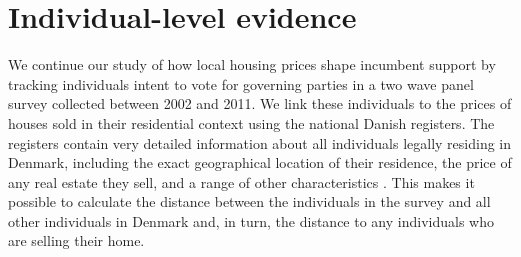 \documentclass[12pt,a4paper]{article}
\begin{document}








\section{Individual-level evidence}
We continue our study of how local housing prices shape incumbent support by tracking individuals intent to vote for governing parties in a two wave panel survey collected between 2002 and 2011. We link these individuals to the prices of houses sold in their residential context using the national Danish registers. The registers contain very detailed information about all individuals legally residing in Denmark, including the exact geographical location of their residence, the price of any real estate they sell, and a range of other characteristics \citep{thygesen2011introduction}. This makes it possible to calculate the distance between the individuals in the survey and all other individuals in Denmark and, in turn, the distance to any individuals who are selling their home. 
 
\end{document}
